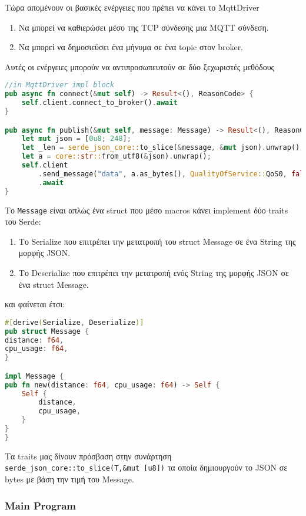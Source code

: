 Τώρα απομένουν οι βασικές ενέργειες που πρέπει να κάνει το MqttDriver

\begin{enumerate}
\item Να μπορεί να καθιερώσει μέσο της TCP σύνδεσης μια MQTT σύνδεση.
\item Να μπορεί να δημοσιεύσει ένα μήνυμα σε ένα topic στον broker.
\end{enumerate}

Αυτές οι ενέργειες μπορούν να αντιπροσωπευτούν σε δύο ξεχωριστές μεθόδους

\begin{lstlisting}[language=Rust]
//in MqttDriver impl block
pub async fn connect(&mut self) -> Result<(), ReasonCode> {
    self.client.connect_to_broker().await
}

pub async fn publish(&mut self, message: Message) -> Result<(), ReasonCode> {
    let mut json = [0u8; 248];
    let _len = serde_json_core::to_slice(&message, &mut json).unwrap();
    let a = core::str::from_utf8(&json).unwrap();
    self.client
        .send_message("data", a.as_bytes(), QualityOfService::QoS0, false)
        .await
}
\end{lstlisting}

Το \verb|Message| είναι απλώς ένα struct που μέσο macros κάνει implement
δύο traits του Serde:

\begin{enumerate}
\item Το Serialize που επιτρέπει την μετατροπή του struct Message σε ένα
  String της μορφής JSON.
\item Το Deserialize που επιτρέπει την μετατροπή ενός String της
  μορφής JSON σε ένα struct Message.
\end{enumerate}

και φαίνεται έτσι:

\begin{lstlisting}[language=Rust]
#[derive(Serialize, Deserialize)]
pub struct Message {
distance: f64,
cpu_usage: f64,
}

impl Message {
pub fn new(distance: f64, cpu_usage: f64) -> Self {
    Self {
        distance,
        cpu_usage,
    }
}
}
\end{lstlisting}

Τα traits μας δίνουν πρόσβαση στην συνάρτηση \verb|serde_json_core::to_slice(T,&mut [u8])|
τα οποία δημιουργούν το JSON σε bytes με βάση την τιμή του Message.

\subsubsection{Main Program}

